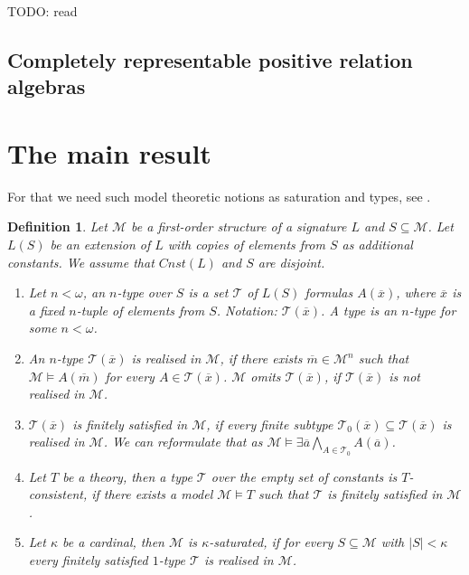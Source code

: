 \documentclass[a4paper]{article}
\theoremstyle{defin}
\newtheorem{definition}{Definition}
\theoremstyle{theorem}
\theoremstyle{claim}
\theoremstyle{prop}
\theoremstyle{lemma}
\theoremstyle{fact}
\theoremstyle{ex}
\theoremstyle{col}
\begin{document}
TODO: read \cite{egrot2012completely}

\subsection{Completely representable positive relation algebras}

\section{The main result}

For that we need such model theoretic notions as saturation and types, see \cite[Section 6.3]{hodges1993model}.

\begin{definition} Let $\mathcal{M}$ be a first-order structure of a signature $L$ and $S \subseteq \mathcal{M}$. Let $L(S)$ be an extension of $L$ with copies of elements from $S$ as additional constants. We assume that $Cnst(L)$ and $S$ are disjoint.

\begin{enumerate}
\item Let $n < \omega$, an $n$-type over $S$ is a set $\mathcal{T}$ of $L(S)$ formulas $A(\overline{x})$, where $\overline{x}$ is a fixed $n$-tuple of elements from $S$. Notation: $\mathcal{T}(\overline{x})$. A type is an $n$-type for some $n < \omega$.
\item An $n$-type $\mathcal{T}(\overline{x})$ is realised in $\mathcal{M}$, if there exists $\overline{m} \in \mathcal{M}^n$ such that $\mathcal{M} \models A(\overline{m})$ for every $A \in \mathcal{T}(\overline{x})$. $\mathcal{M}$ omits $\mathcal{T}(\overline{x})$, if $\mathcal{T}(\overline{x})$ is not realised in $\mathcal{M}$.
\item $\mathcal{T}(\overline{x})$ is finitely satisfied in $\mathcal{M}$, if every finite subtype $\mathcal{T}_0(\overline{x}) \subseteq \mathcal{T}(\overline{x})$ is realised in $\mathcal{M}$. We can reformulate that as $\mathcal{M} \models \exists \overline{a} \bigwedge \limits_{A \in \mathcal{T}_0} A(\overline{a})$.
\item Let $T$ be a theory, then a type $\mathcal{T}$ over the empty set of constants is $T$-consistent, if there exists a model $\mathcal{M} \models T$ such that $\mathcal{T}$ is finitely satisfied in $\mathcal{M}$.
\item Let $\kappa$ be a cardinal, then $\mathcal{M}$ is $\kappa$-saturated, if for every $S \subseteq \mathcal{M}$ with $|S| < \kappa$ every finitely satisfied $1$-type $\mathcal{T}$ is realised in $\mathcal{M}$.
\end{enumerate}
\end{definition}
\end{document}
